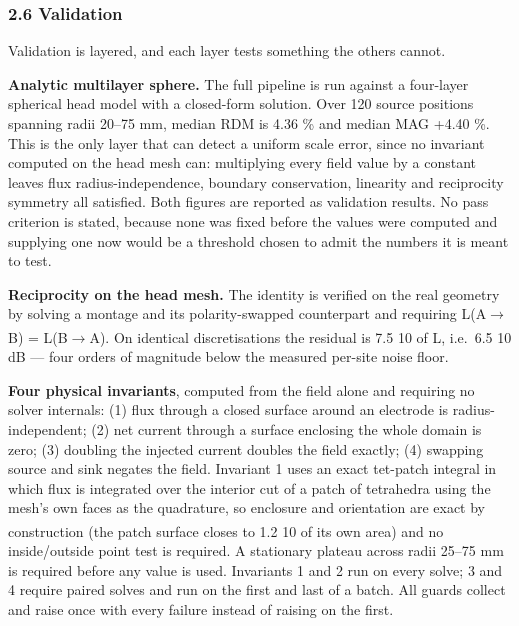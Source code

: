 \documentclass[
  11pt,
  a4paper,
]{article}
\newcounter{none} %
\begin{document}
\subsubsection{2.6 Validation}\label{validation}

Validation is layered, and each layer tests something the others cannot.

\textbf{Analytic multilayer sphere.} The full pipeline is run against a four-layer
spherical head model with a closed-form solution. Over 120 source positions
spanning radii 20--75 mm, median RDM is 4.36 \% and median MAG +4.40 \%. This is
the only layer that can detect a uniform scale error, since no invariant
computed on the head mesh can: multiplying every field value by a constant
leaves flux radius-independence, boundary conservation, linearity and
reciprocity symmetry all satisfied. Both figures are reported as validation
results. No pass criterion is stated, because none was fixed before the values
were computed and supplying one now would be a threshold chosen to admit the
numbers it is meant to test.

\textbf{Reciprocity on the head mesh.} The identity is verified on the real geometry
by solving a montage and its polarity-swapped counterpart and requiring
L(A$\rightarrow$B) = \textminus{}L(B$\rightarrow$A). On identical discretisations the residual is 7.5 \texttimes{} 10\textsuperscript{} of
\textbar L\textbar, i.e.~6.5 \texttimes{} 10\textsuperscript{} dB --- four orders of magnitude below the measured per-site
noise floor.

\textbf{Four physical invariants}, computed from the field alone and requiring no
solver internals: (1) flux through a closed surface around an electrode is
radius-independent; (2) net current through a surface enclosing the whole domain
is zero; (3) doubling the injected current doubles the field exactly; (4)
swapping source and sink negates the field. Invariant 1 uses an exact tet-patch
integral in which flux is integrated over the interior cut of a patch of
tetrahedra using the mesh's own faces as the quadrature, so enclosure and
orientation are exact by construction (the patch surface closes to 1.2 \texttimes{} 10\textsuperscript{}
of its own area) and no inside/outside point test is required. A stationary
plateau across radii 25--75 mm is required before any value is used. Invariants 1
and 2 run on every solve; 3 and 4 require paired solves and run on the first and
last of a batch. All guards collect and raise once with every failure instead of
raising on the first.
\end{document}
